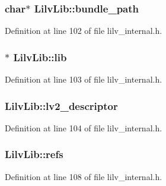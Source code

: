 \subsubsection[{\texorpdfstring{bundle\+\_\+path}{bundle_path}}]{\setlength{\rightskip}{0pt plus 5cm}char$\ast$ Lilv\+Lib\+::bundle\+\_\+path}\hypertarget{struct_lilv_lib_a0d4207243f3aeb738501d9f85133d666}{}\label{struct_lilv_lib_a0d4207243f3aeb738501d9f85133d666}


Definition at line 102 of file lilv\+\_\+internal.\+h.

\subsubsection[{\texorpdfstring{lib}{lib}}]{$\ast$ Lilv\+Lib\+::lib}\hypertarget{struct_lilv_lib_ad87f8e93c0aceedecb199f2a6e0f779b}{}\label{struct_lilv_lib_ad87f8e93c0aceedecb199f2a6e0f779b}


Definition at line 103 of file lilv\+\_\+internal.\+h.

\subsubsection[{\texorpdfstring{lv2\+\_\+descriptor}{lv2_descriptor}}]{ Lilv\+Lib\+::lv2\+\_\+descriptor}\hypertarget{struct_lilv_lib_a1c690d70bc1e9d157a79ceb92d0f0e62}{}\label{struct_lilv_lib_a1c690d70bc1e9d157a79ceb92d0f0e62}


Definition at line 104 of file lilv\+\_\+internal.\+h.

\subsubsection[{\texorpdfstring{refs}{refs}}]{ Lilv\+Lib\+::refs}\hypertarget{struct_lilv_lib_ad7001012df0c130733ed9e687d33166a}{}\label{struct_lilv_lib_ad7001012df0c130733ed9e687d33166a}


Definition at line 108 of file lilv\+\_\+internal.\+h.

